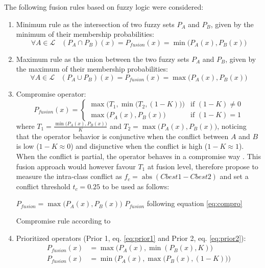 \documentclass[10pt]{article}
\DeclareMathOperator{\abs}{abs}
\begin{document}
The following fusion rules based on fuzzy logic were considered:
\begin{enumerate}
    \item Minimum rule as the intersection of two fuzzy sets $P_A$ and $P_B$, given by the minimum of their membership probabilities:
    \begin{equation}
        \forall A\in\mathcal{L} \;\;\; (P_A\cap P_B)(x) = P_{fusion}(x) =\min\big(P_A(x),P_B(x)\big)
    \end{equation}
    \item Maximum rule as the union between the two fuzzy sets $P_A$ and $P_B$, given by the maximum of their membership probabilities:
    \begin{equation}
        \forall A\in\mathcal{L} \;\;\; (P_A\cup P_B)(x) = P_{fusion}(x)=\max\big(P_A(x),P_B(x)\big)
    \end{equation}
    \item Compromise operator:
    \begin{equation}\label{eq:compro}
        P_{fusion}(x)=
        \begin{cases}
            \max\Big(T_1,\min\big(T_2,(1-K)\big)\Big)& \text{if } (1-K)\neq 0\\
            \max\Big(P_A(x),P_B(x)\Big) &\text{if }(1-K)= 1
        \end{cases}
    \end{equation}
    where $T_1=\frac{\min\big(P_A(x),P_B(x)\big)}{K}$ and $T_2=\max\big(P_A(x),P_B(x)\big)$, noticing that the operator behavior is conjunctive when the conflict between $A$ and $B$ is low ($1-K\approx 0$) and disjunctive when the conflict is high ($1-K\approx 1$). When the conflict is partial, the operator behaves in a compromise way \parencite{ouerghemmi_two-step_2017}. This fusion approach would however favour $T_1$ at fusion level, therefore \cite{ouerghemmi_two-step_2017} propose to measure the intra-class conflict as $f_c=\abs(Cbest1-Cbest2)$ and set a conflict threshold $t_c=0.25$ to be used as follows:
    
    \begin{algorithm}[H]
        \begin{algorithmic}
            \State $P_{fusion}=\max\big(P_A(x),P_B(x)\big)$
            \Else
            \State $P_{fusion}$ following equation \ref{eq:compro}
            \EndIf
        \end{algorithmic}
        \caption{Compromise rule according to \cite{ouerghemmi_two-step_2017}}
        \label{alg:comp-wo}
    \end{algorithm}
    \item Prioritized operators (Prior 1, eq. \ref{eq:prior1} and Prior 2, eq. \ref{eq:prior2}):
    \begin{align}
        P_{fusion}(x)&=\max\big(P_A(x),\min(P_B(x),K)\big)\label{eq:prior1}\\
        P_{fusion}(x)&=\min\Big(P_A(x),\max\big(P_B(x),(1-K)\big)\Big)\label{eq:prior2}
    \end{align}
\end{enumerate}
\end{document}
